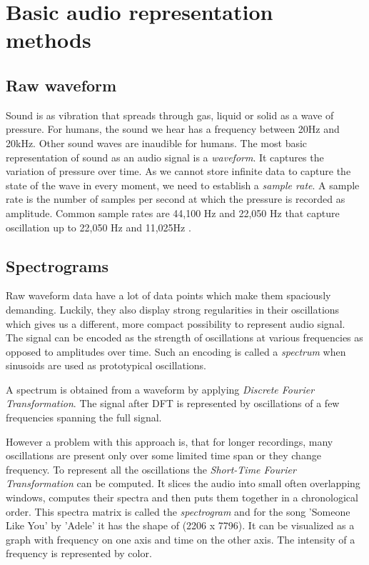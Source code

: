 \section{Basic audio representation methods}\label{sec:basic_music_representation_methods}
 

\subsection{Raw waveform}
Sound is as vibration that spreads through gas, liquid or solid as a wave of pressure. For humans, the sound we hear has a frequency between 20Hz and 20kHz. Other sound waves are inaudible for humans. The most basic representation of sound as an audio signal is a \textit{waveform}. It captures the variation of pressure over time. As we cannot store infinite data to capture the state of the wave in every moment, we need to establish a \textit{sample rate}. A sample rate is the number of samples per second at which the pressure is recorded as amplitude. Common sample rates are 44,100 Hz and 22,050 Hz that capture oscillation up to 22,050 Hz and 11,025Hz \cite{Schluter2017}.

\subsection{Spectrograms}
Raw waveform data have a lot of data points which make them spaciously demanding. Luckily, they also display strong regularities in their oscillations which gives us a different, more compact possibility to represent audio signal. The signal can be encoded as the strength of oscillations at various frequencies as opposed to amplitudes over time. Such an encoding is called a \textit{spectrum} when sinusoids are used as prototypical oscillations.

A spectrum is obtained from a waveform by applying \textit{Discrete Fourier Transformation}. The signal after DFT is represented by oscillations of a few frequencies spanning the full signal. 

However a problem with this approach is, that for longer recordings, many oscillations are present only over some limited time span or they change frequency. To represent all the oscillations the \textit{Short-Time Fourier Transformation} can be computed. It slices the audio into small often overlapping windows, computes their spectra and then puts them together in a chronological order. This spectra matrix is called the \textit{spectrogram} and for the song 'Someone Like You' by 'Adele' it has the shape of (2206 x 7796). It can be visualized as a graph with frequency on one axis and time on the other axis. The intensity of a frequency is represented by color.

